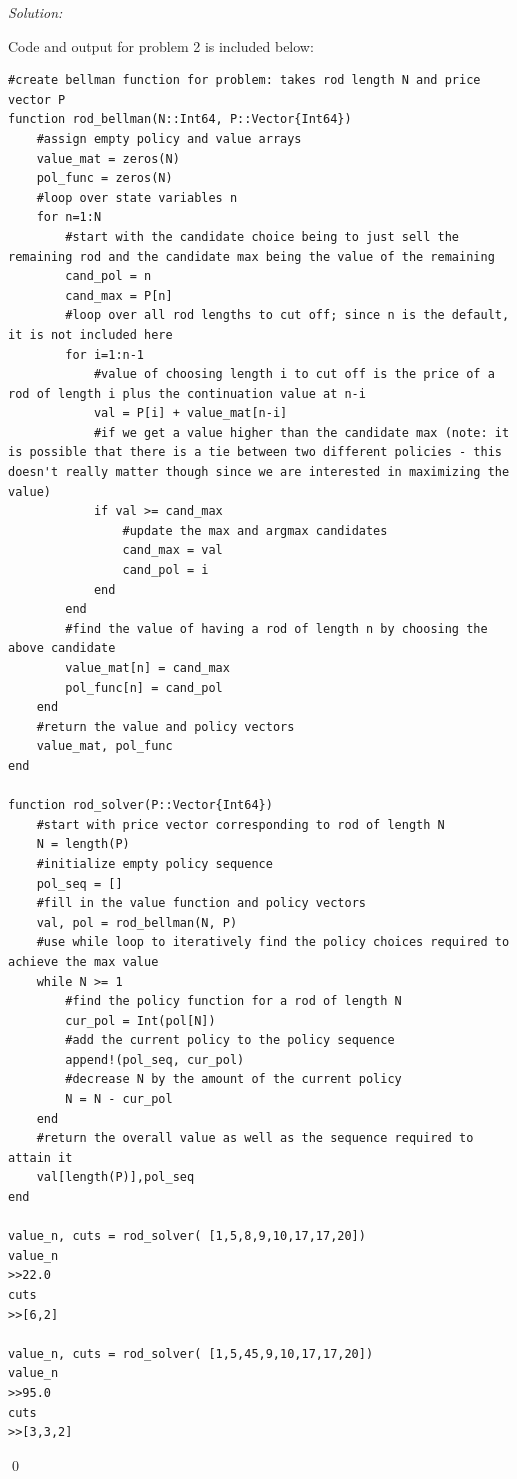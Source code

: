 \documentclass[12pt]{article}
\newenvironment{problem}[2][Problem]{\begin{trivlist}
       \item[\hskip \labelsep {\bfseries #1}\hskip \labelsep {\bfseries #2.}]}{\end{trivlist}}
\newenvironment{sol}
           {\emph{Solution:}
           }
           {
           \qed
           }
\begin{document}
       \begin{problem}{2}
        
       \end{problem}
       \begin{sol}
        Code and output for problem 2 is included below:
        \begin{lstlisting}
#create bellman function for problem: takes rod length N and price vector P
function rod_bellman(N::Int64, P::Vector{Int64})
    #assign empty policy and value arrays
    value_mat = zeros(N)
    pol_func = zeros(N)
    #loop over state variables n 
    for n=1:N
        #start with the candidate choice being to just sell the remaining rod and the candidate max being the value of the remaining
        cand_pol = n
        cand_max = P[n]
        #loop over all rod lengths to cut off; since n is the default, it is not included here
        for i=1:n-1
            #value of choosing length i to cut off is the price of a rod of length i plus the continuation value at n-i
            val = P[i] + value_mat[n-i]
            #if we get a value higher than the candidate max (note: it is possible that there is a tie between two different policies - this doesn't really matter though since we are interested in maximizing the value)
            if val >= cand_max
                #update the max and argmax candidates
                cand_max = val
                cand_pol = i
            end
        end
        #find the value of having a rod of length n by choosing the above candidate 
        value_mat[n] = cand_max
        pol_func[n] = cand_pol 
    end
    #return the value and policy vectors
    value_mat, pol_func
end

function rod_solver(P::Vector{Int64})
    #start with price vector corresponding to rod of length N
    N = length(P)
    #initialize empty policy sequence
    pol_seq = []
    #fill in the value function and policy vectors 
    val, pol = rod_bellman(N, P)
    #use while loop to iteratively find the policy choices required to achieve the max value
    while N >= 1
        #find the policy function for a rod of length N
        cur_pol = Int(pol[N])
        #add the current policy to the policy sequence
        append!(pol_seq, cur_pol)
        #decrease N by the amount of the current policy
        N = N - cur_pol
    end
    #return the overall value as well as the sequence required to attain it
    val[length(P)],pol_seq
end

value_n, cuts = rod_solver( [1,5,8,9,10,17,17,20])
value_n
>>22.0
cuts
>>[6,2]

value_n, cuts = rod_solver( [1,5,45,9,10,17,17,20])
value_n
>>95.0
cuts
>>[3,3,2]
        \end{lstlisting}
       \end{sol}
\end{document}
